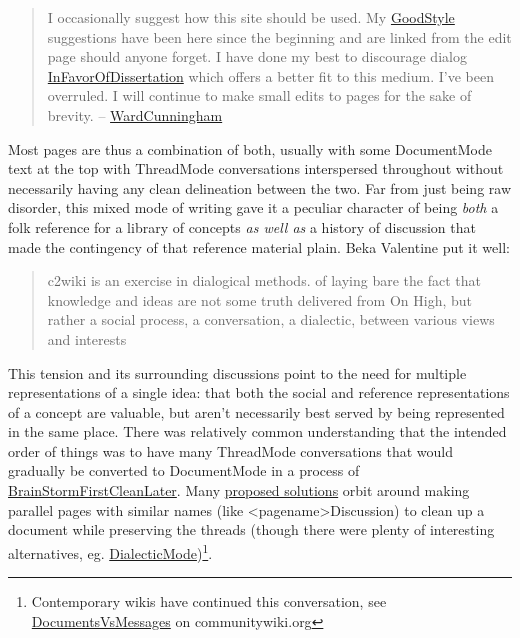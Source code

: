 \begin{quote}
I occasionally suggest how this site should be used. My
\href{http://wiki.c2.com/?GoodStyle}{GoodStyle} suggestions have been
here since the beginning and are linked from the edit page should anyone
forget. I have done my best to discourage dialog
\href{http://wiki.c2.com/?InFavorOfDissertation}{InFavorOfDissertation}
which offers a better fit to this medium. I've been overruled. I will
continue to make small edits to pages for the sake of brevity. --
\href{http://wiki.c2.com/?WardCunningham}{WardCunningham} \citep{C2wikiWikiHistory} 
\end{quote}

Most pages are thus a combination of both, usually with some
DocumentMode text at the top with ThreadMode conversations interspersed
throughout without necessarily having any clean delineation between the
two. Far from just being raw disorder, this mixed mode of writing gave
it a peculiar character of being \emph{both} a folk reference for a
library of concepts \emph{as well as} a history of discussion that made
the contingency of that reference material plain. Beka Valentine put it
well:

\begin{quote}
c2wiki is an exercise in dialogical methods. of laying bare the fact
that knowledge and ideas are not some truth delivered from On High, but
rather a social process, a conversation, a dialectic, between various
views and interests \citep{valentineC2wikiExerciseDialogical2021} 
\end{quote}

This tension and its surrounding discussions point to the need for
multiple representations of a single idea: that both the social and
reference representations of a concept are valuable, but aren't
necessarily best served by being represented in the same place. There
was relatively common understanding that the intended order of things
was to have many ThreadMode conversations that would gradually be
converted to DocumentMode in a process of
\href{http://wiki.c2.com/?BrainStormFirstCleanLater}{BrainStormFirstCleanLater}.
Many \href{http://wiki.c2.com/?ConvertThreadModeToDocumentMode}{proposed
solutions} orbit around making parallel pages with similar names (like
\textless pagename\textgreater Discussion) to clean up a document while
preserving the threads (though there were plenty of interesting
alternatives, eg.
\href{http://wiki.c2.com/?DialecticMode}{DialecticMode})\footnote{Contemporary
  wikis have continued this conversation, see
  \href{https://communitywiki.org/wiki/DocumentsVsMessages}{DocumentsVsMessages}
  on communitywiki.org}.

